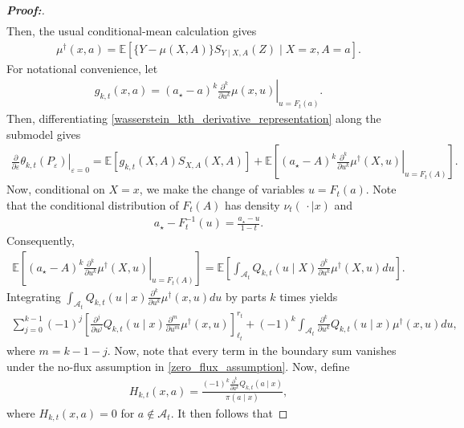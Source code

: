 \documentclass[11pt,twoside]{article}
\theoremstyle{definition}
\theoremstyle{remark}
\begin{document}
\begin{proof}[\textbf{Proof:}]
\begin{align*}
\end{align*}
Then, the usual conditional-mean calculation gives
\begin{align} \label{mu_dagger}
    \mu^\dagger(x,a) = \mathbb{E}\left[ \{Y-\mu(X,A)\}S_{Y\mid X,A}(Z) \mid  X=x,A=a \right].
\end{align}
For notational convenience, let
\begin{align*}
    g_{k,t}(x,a) = (a_\star-a)^k \left. \frac{\partial^k}{\partial u^k}\mu(x,u) \right|_{u=F_t(a)}.
\end{align*}
Then, differentiating \cref{wasserstein_kth_derivative_representation} along the submodel gives
\begin{align*}
    \left. \frac{\partial}{\partial\varepsilon} \theta_{k,t}(P_\varepsilon) \right|_{\varepsilon=0} =  \mathbb{E}\left[ g_{k,t}(X,A)S_{X,A}(X,A) \right] + \mathbb{E}\left[ (a_\star-A)^k \left. \frac{\partial^k}{\partial u^k} \mu^\dagger(X,u) \right|_{u=F_t(A)} \right].
\end{align*}
Now, conditional on $X=x$, we make the change of variables $u=F_t(a)$. Note that the conditional distribution of $F_t(A)$ has density $\nu_t(\,\cdot\mid x)$ and
\begin{align*}
    a_\star-F_t^{-1}(u) = \frac{a_\star-u}{1-t}.
\end{align*}
Consequently, 
\begin{align*} 
    \mathbb{E}\left[ (a_\star-A)^k \left. \frac{\partial^k}{\partial u^k} \mu^\dagger(X,u) \right|_{u=F_t(A)} \right] = \mathbb{E}\left[ \int_{\mathcal{A}_t} Q_{k,t}(u\mid X) \frac{\partial^k}{\partial u^k} \mu^\dagger(X,u)du \right].
\end{align*}
Integrating $\int_{\mathcal{A}_t} Q_{k,t}(u\mid x) \frac{\partial^k}{\partial u^k} \mu^\dagger(x,u)du$ by parts $k$ times yields
\begin{align*}
    \sum_{j=0}^{k-1} (-1)^j\left[ \frac{\partial^j}{\partial u^j}Q_{k,t}(u\mid x) \frac{\partial^m}{\partial u^m}\mu^\dagger(x,u)\right]_{\ell_t}^{r_t} +(-1)^k\int_{\mathcal{A}_t} \frac{\partial^k}{\partial u^k}Q_{k,t}(u\mid x) \mu^\dagger(x,u)du,
\end{align*}
where $m = k-1-j$. Now, note that every term in the boundary sum vanishes under the no-flux assumption in \cref{zero_flux_assumption}. Now, define
\begin{align}
    H_{k,t}(x,a) = \frac{(-1)^k \frac{\partial^k }{\partial a^k} Q_{k,t}(a\mid x)}{\pi(a\mid x)},
    \label{wasserstein_kth_riesz_weight}
\end{align}
where $H_{k,t}(x,a)=0$ for $a\notin\mathcal{A}_t$. It then follows that

\end{proof}
\end{document}
